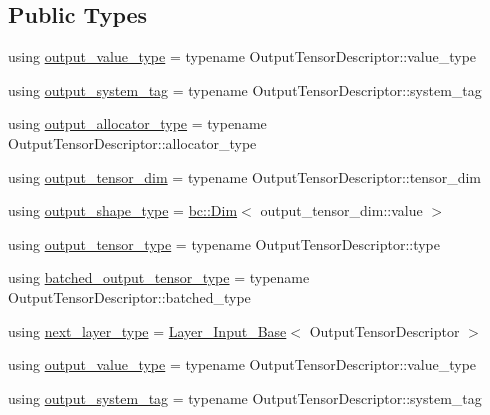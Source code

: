 \subsection*{Public Types}
\begin{DoxyCompactItemize}
\item 
using \hyperlink{structbc_1_1nn_1_1Layer__Output__Base_acbef11226ebb0a194a319630a4f3c871}{output\+\_\+value\+\_\+type} = typename Output\+Tensor\+Descriptor\+::value\+\_\+type
\item 
using \hyperlink{structbc_1_1nn_1_1Layer__Output__Base_ab95900f0cbd689cd1d2c187ac8d4ddd0}{output\+\_\+system\+\_\+tag} = typename Output\+Tensor\+Descriptor\+::system\+\_\+tag
\item 
using \hyperlink{structbc_1_1nn_1_1Layer__Output__Base_a7cde98d6bf97cd5bc4aef4039ee26536}{output\+\_\+allocator\+\_\+type} = typename Output\+Tensor\+Descriptor\+::allocator\+\_\+type
\item 
using \hyperlink{structbc_1_1nn_1_1Layer__Output__Base_a52a461f65c3b8ae04ae445723a334e13}{output\+\_\+tensor\+\_\+dim} = typename Output\+Tensor\+Descriptor\+::tensor\+\_\+dim
\item 
using \hyperlink{structbc_1_1nn_1_1Layer__Output__Base_aa627047014ee5dff2b9cc1804c791815}{output\+\_\+shape\+\_\+type} = \hyperlink{structbc_1_1Dim}{bc\+::\+Dim}$<$ output\+\_\+tensor\+\_\+dim\+::value $>$
\item 
using \hyperlink{structbc_1_1nn_1_1Layer__Output__Base_a57be15759728568401b4e551f8a8613b}{output\+\_\+tensor\+\_\+type} = typename Output\+Tensor\+Descriptor\+::type
\item 
using \hyperlink{structbc_1_1nn_1_1Layer__Output__Base_a1de6ba739a49078d6cc6d169e85e8d4f}{batched\+\_\+output\+\_\+tensor\+\_\+type} = typename Output\+Tensor\+Descriptor\+::batched\+\_\+type
\item 
using \hyperlink{structbc_1_1nn_1_1Layer__Output__Base_a0c791bc57bcc78e8d82e8a5375f1c584}{next\+\_\+layer\+\_\+type} = \hyperlink{classbc_1_1nn_1_1Layer__Input__Base}{Layer\+\_\+\+Input\+\_\+\+Base}$<$ Output\+Tensor\+Descriptor $>$
\item 
using \hyperlink{structbc_1_1nn_1_1Layer__Output__Base_acbef11226ebb0a194a319630a4f3c871}{output\+\_\+value\+\_\+type} = typename Output\+Tensor\+Descriptor\+::value\+\_\+type
\item 
using \hyperlink{structbc_1_1nn_1_1Layer__Output__Base_ab95900f0cbd689cd1d2c187ac8d4ddd0}{output\+\_\+system\+\_\+tag} = typename Output\+Tensor\+Descriptor\+::system\+\_\+tag
\item 

\end{DoxyCompactItemize}
